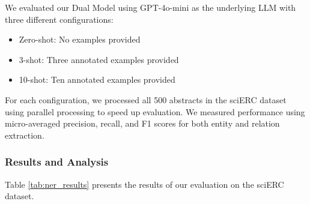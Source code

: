 \documentclass[11pt]{article}
\begin{document}
We evaluated our Dual Model using GPT-4o-mini as the underlying LLM with three different configurations:
\begin{itemize}
    \item Zero-shot: No examples provided
    \item 3-shot: Three annotated examples provided
    \item 10-shot: Ten annotated examples provided
\end{itemize}

For each configuration, we processed all 500 abstracts in the sciERC dataset using parallel processing to speed up evaluation. We measured performance using micro-averaged precision, recall, and F1 scores for both entity and relation extraction.

\subsubsection{Results and Analysis}

Table \ref{tab:ner_results} presents the results of our evaluation on the sciERC dataset.
\end{document}
